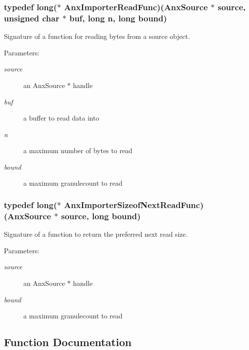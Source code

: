\subsubsection{\setlength{\rightskip}{0pt plus 5cm}typedef long($\ast$ {\bf Anx\-Importer\-Read\-Func})({\bf Anx\-Source} $\ast$ source, unsigned char $\ast$ buf, long n, long bound)}\label{anx__import_8h_a5}


Signature of a function for reading bytes from a source object. 

\begin{Desc}
\item[Parameters:]
\begin{description}
\item[{\em source}]an Anx\-Source $\ast$ handle \item[{\em buf}]a buffer to read data into \item[{\em n}]a maximum number of bytes to read \item[{\em bound}]a maximum granulecount to read \end{description}
\end{Desc}
\subsubsection{\setlength{\rightskip}{0pt plus 5cm}typedef long($\ast$ {\bf Anx\-Importer\-Sizeof\-Next\-Read\-Func})({\bf Anx\-Source} $\ast$ source, long bound)}\label{anx__import_8h_a6}


Signature of a function to return the preferred next read size. 

\begin{Desc}
\item[Parameters:]
\begin{description}
\item[{\em source}]an Anx\-Source $\ast$ handle \item[{\em bound}]a maximum granulecount to read \end{description}
\end{Desc}


\subsection{Function Documentation}
